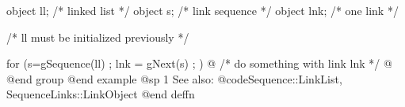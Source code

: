 object  ll;  /*  linked list    */
object  s;   /*  link sequence  */
object  lnk; /*  one link       */

/*  ll must be initialized previously  */

for (s=gSequence(ll) ; lnk = gNext(s) ; )  @{
        /*  do something with link lnk  */
@}
@end group
@end example
@sp 1
See also:  @code{Sequence::LinkList, SequenceLinks::LinkObject}
@end deffn











